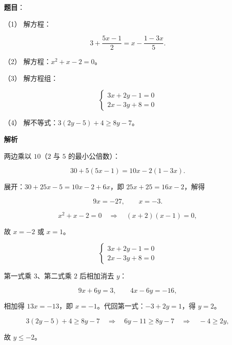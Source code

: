 \begin{answer}

\textbf{题目}：

（1） 解方程：

\nopagebreak[4]
\[
3+\frac{5x-1}{2}=x-\frac{1-3x}{5}.
\]

（2） 解方程：$x^2+x-2=0$。

（3） 解方程组：

\nopagebreak[4]
\[
\begin{cases}
3x+2y-1=0\\
2x-3y+8=0
\end{cases}
\]

（4） 解不等式：$3(2y-5)+4\geqslant8y-7$。

\textbf{解析}


两边乘以 $10$（$2$ 与 $5$ 的最小公倍数）：

\nopagebreak[4]
\[
30+5(5x-1)=10x-2(1-3x).
\]

展开：$30+25x-5=10x-2+6x$，即 $25x+25=16x-2$，解得

\nopagebreak[4]
\[
9x=-27,\qquad x=-3.
\]


\nopagebreak[4]
\[
x^2+x-2=0\quad\Longrightarrow\quad(x+2)(x-1)=0,
\]

故 $x=-2$ 或 $x=1$。


\nopagebreak[4]
\[
\begin{cases}
3x+2y-1=0\\
2x-3y+8=0
\end{cases}
\]

第一式乘 $3$、第二式乘 $2$ 后相加消去 $y$：

\nopagebreak[4]
\[
9x+6y=3,\qquad 4x-6y=-16,
\]

相加得 $13x=-13$，即 $x=-1$。代回第一式：$-3+2y=1$，得 $y=2$。


\nopagebreak[4]
\[
3(2y-5)+4\geqslant8y-7
\quad\Longrightarrow\quad
6y-11\geqslant8y-7
\quad\Longrightarrow\quad
-4\geqslant2y,
\]

故 $y\leqslant-2$。





\end{answer}
